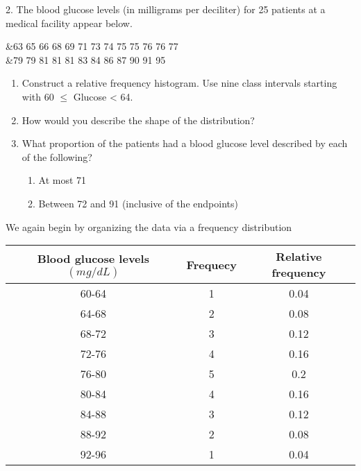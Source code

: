 \documentclass{report}
\begin{document}
    \pagebreak 
    \begin{mdframed}
        2. The blood glucose levels (in milligrams per deciliter) for 25 patients at a medical facility appear below.
        \bigbreak \noindent 
        \begin{center}
            &63 65 66 68 69 71 73 74 75 75 76 76 77 \\
            &79 79 81 81 81 83 84 86 87 90 91 95
        \end{center}
        \bigbreak \noindent 
        \begin{enumerate}[label=(\alph*)]
            \item  Construct a relative frequency histogram. Use nine class intervals starting with 60 $\leq$ Glucose < 64. 
            \item How would you describe the shape of the distribution?
            \item What proportion of the patients had a blood glucose level described by each of the following? 
                \begin{enumerate}[label=(\roman*)]
                    \item At most 71
                    \item  Between 72 and 91 (inclusive of the endpoints)
                \end{enumerate}
        \end{enumerate}
    \end{mdframed}
    \bigbreak \noindent 
    We again begin by organizing the data via a frequency distribution
    \bigbreak \noindent 
    \begin{center}
        \begin{tabular}{c|c|c}
            Blood glucose levels $(mg/dL)$ & Frequecy & Relative frequency \\
            \hline
            60-64 & 1 &0.04\\
            64-68 & 2 &0.08\\
            68-72 & 3 &0.12\\
            72-76 & 4 &0.16\\
            76-80 & 5 &0.2\\
            80-84 & 4 &0.16\\
            84-88 & 3 &0.12\\
            88-92 & 2 &0.08\\
            92-96 & 1 & 0.04
        \end{tabular}
    \end{center}
\end{document}
